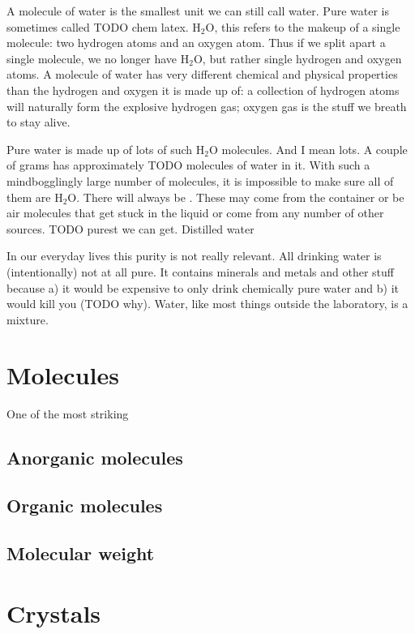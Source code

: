 A molecule of water is the smallest unit we can still call water. Pure water is sometimes called TODO chem latex. H$_2$O, this refers to the makeup of a single molecule: two hydrogen atoms and an oxygen atom. Thus if we split apart a single molecule, we no longer have H$_2$O, but rather single hydrogen and oxygen atoms. A molecule of water has very different chemical and physical properties than the hydrogen and oxygen it is made up of: a collection of hydrogen atoms will naturally form the explosive hydrogen gas; oxygen gas is the stuff we breath to stay alive.

Pure water is made up of lots of such H$_2$O molecules. And I mean lots. A couple of grams has approximately TODO molecules of water in it. With such a mindbogglingly large number of molecules, it is impossible to make sure all of them are H$_2$O. There will always be . These may come from the container or be air molecules that get stuck in the liquid or come from any number of other sources. TODO purest we can get. Distilled water

In our everyday lives this purity is not really relevant. All drinking water is (intentionally) not at all pure. It contains minerals and metals and other stuff because a) it would be expensive to only drink chemically pure water and b) it would kill you (TODO why). Water, like most things outside the laboratory, is a mixture. 

\section{Molecules}

One of the most striking

\subsection{Anorganic molecules}

\subsection{Organic molecules}

\subsection{Molecular weight}

\section{Crystals}
